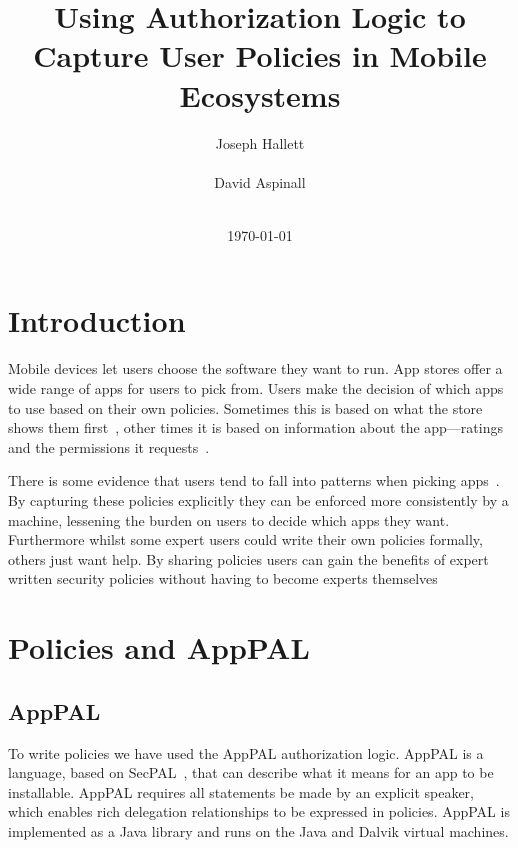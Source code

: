 \documentclass[twocolumn,letterpaper]{soups-poster}
\newcommand{\citep}[1]{\cite{#1}}
\begin{document}
\title{Using Authorization Logic to Capture User Policies in Mobile Ecosystems}
\author{%
  \alignauthor{}
  Joseph Hallett\\
  \\
  \alignauthor{}
  David Aspinall\\
  \\
}
\date\today
\maketitle

\section{Introduction}

Mobile devices let users choose the software they want to run.
App stores offer a wide range of apps for users to pick from.
Users make the decision of which apps to use based on their own policies.
Sometimes this is based on what the store shows them first~\citep{Prata:2012in},
other times it is based on information about the app---ratings and the
permissions it requests~\citep{Kelley:2013kc}.

There is some evidence that users tend to fall into patterns when picking
apps~\citep{Sadeh:2014vq}.  By capturing these policies explicitly they can be
enforced more consistently by a machine, lessening the burden on users to decide
which apps they want.
Furthermore whilst some expert users could write their own policies formally, others
just want help.  By sharing policies users can gain the benefits of expert
written security policies without having to become experts themselves

\section{Policies and AppPAL}

\subsection{AppPAL}

To write policies we have used the AppPAL authorization logic.
AppPAL is a language, based on SecPAL~\citep{Becker:2006vh}, that can describe
what it means for an app to be installable. AppPAL requires all statements be
made by an explicit speaker, which enables rich delegation relationships to be
expressed in policies.
AppPAL is implemented as a Java library and runs on the Java and Dalvik virtual
machines.
\end{document}
